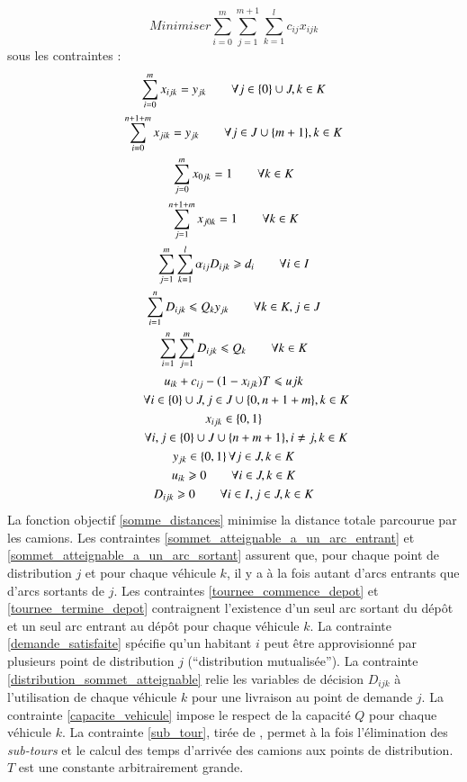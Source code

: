 \documentclass[5p,authoryear,square]{elsarticle}
\begin{document}
\begin{equation}\label{somme_distances}
Minimiser \sum_{i=0}^{m}\sum_{j=1}^{m+1}\sum_{k=1}^{l} c_{ij} x_{ijk}
\end{equation}
 sous les contraintes :
\begin{gather}
\sum_{i=0}^{m}x_{ijk} = y_{jk}\qquad \forall j\in \{0\} \cup J, k \in K \label{sommet_atteignable_a_un_arc_entrant}\\ 
\sum_{i=0}^{n+1+m}x_{jik} = y_{jk}\qquad \forall j\in J \cup \{m+1\}, k \in K \label{sommet_atteignable_a_un_arc_sortant}\\ 
\sum_{j=0}^{m}x_{0jk} = 1 \qquad \forall k \in K \label{tournee_commence_depot}\\ 
\sum_{j=1}^{n+1+m}x_{j0k} = 1 \qquad \forall k \in K \label{tournee_termine_depot}\\
\sum_{j=1}^{m}\sum_{k=1}^{l} \alpha_{ij}D_{ijk} \geqslant d_{i}\qquad \forall i\in I \label{demande_satisfaite}\\
\sum_{i=1}^{n}D_{ijk} \leqslant Q_{k}y_{jk}\qquad \forall k \in K, j\in J \label{distribution_sommet_atteignable}\\
\sum_{i=1}^{n}\sum_{j=1}^{m}D_{ijk} \leqslant Q_k\qquad \forall k \in K \label{capacite_vehicule}\\
u_{ik} + c_{ij} - (1 - x_{ijk})T \leqslant u{jk} \notag \\
\qquad \forall i \in \{0\} \cup J, j \in J \cup \{0,n+1+m\}, k \in K \label{sub_tour}\\
x_{ijk} \in\left\{0,1\right\} \notag \\
\qquad\forall i,j\in\{0\}\cup J \cup \{n+m+1\}, i \neq j, k \in K \\
y_{jk} \in\left\{0,1\right\} \forall j\in J, k \in K\\ 
u_{ik} \geqslant 0  \qquad\forall i\in J, k \in K\\ 
D_{ijk} \geqslant 0 \qquad\forall i\in I, j\in J, k \in K\\ 
\end{gather}
La fonction objectif \ref{somme_distances} minimise la distance totale parcourue par les camions. Les contraintes \ref{sommet_atteignable_a_un_arc_entrant} et \ref{sommet_atteignable_a_un_arc_sortant} assurent que, pour chaque point de distribution $j$ et pour chaque véhicule $k$, il y a à la fois autant d'arcs entrants que d'arcs sortants de $j$. Les contraintes \ref{tournee_commence_depot} et \ref{tournee_termine_depot} contraignent l'existence d'un seul arc sortant du dépôt et un seul arc entrant au dépôt pour chaque véhicule $k$. La contrainte \ref{demande_satisfaite} spécifie qu'un habitant $i$ peut être approvisionné par plusieurs point de distribution $j$ (\enquote{distribution mutualisée}). La contrainte \ref{distribution_sommet_atteignable} relie les variables de décision $D_{ijk}$ à l'utilisation de chaque véhicule $k$ pour une livraison au point de demande $j$. La contrainte \ref{capacite_vehicule} impose le respect de la capacité $Q$ pour chaque véhicule $k$. La contrainte \ref{sub_tour}, tirée de \cite{ngueveu_effective_2010}, permet à la fois l'élimination des \emph{sub-tours} et le calcul des temps d'arrivée des camions aux points de distribution. $T$ est une constante arbitrairement grande.
\end{document}
